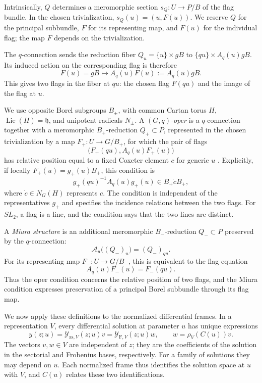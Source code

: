 \documentclass[11pt,leqno]{amsart}
\numberwithin{equation}{section}
\theoremstyle{plain}
\theoremstyle{definition}
\theoremstyle{plain}
\theoremstyle{definition}
\theoremstyle{remark}
\newcommand{\gh}{\mathfrak h}
\begin{document}
Intrinsically, $Q$ determines a meromorphic section $s_Q:U\to P/B$ of the flag bundle.  In the chosen trivialization, $s_Q(u)=(u,F(u))$.  We reserve $Q$ for the principal subbundle, $F$ for its representing map, and $F(u)$ for the individual flag; the map $F$ depends on the trivialization.

The $q$-connection sends the reduction fiber $Q_u=\{u\}\times gB$ to $\{qu\}\times A_q(u)gB$.  Its induced action on the corresponding flag is therefore
\[
 F(u)=gB\longmapsto A_q(u)F(u):=A_q(u)gB.
\]
This gives two flags in the fiber at $qu$: the chosen flag $F(qu)$ and the image of the flag at $u$.

We use opposite Borel subgroups $B_\pm$, with common Cartan torus $H$, $\operatorname{Lie}(H)=\gh$, and unipotent radicals $N_\pm$.  A \emph{$(G,q)$-oper} is a $q$-connection together with a meromorphic $B_+$-reduction $Q_+\subset P$, represented in the chosen trivialization by a map $F_+:U\to G/B_+$, for which the pair of flags
\[
 \bigl(F_+(qu),A_q(u)F_+(u)\bigr)
\]
has relative position equal to a fixed Coxeter element $c$ for generic $u$ \cite{FKSZ2020}.  Explicitly, if locally $F_+(u)=g_+(u)B_+$, this condition is
\[
 g_+(qu)^{-1}A_q(u)g_+(u)\in B_+\dot cB_+,
\]
where $\dot c\in N_G(H)$ represents $c$.  The condition is independent of the representatives $g_+$ and specifies the incidence relations between the two flags.  For $SL_2$, a flag is a line, and the condition says that the two lines are distinct.

A \emph{Miura structure} is an additional meromorphic $B_-$-reduction $Q_-\subset P$ preserved by the $q$-connection:
\[
 \mathcal A_u\bigl((Q_-)_u\bigr)=(Q_-)_{qu}.
\]
For its representing map $F_-:U\to G/B_-$, this is equivalent to the flag equation
\[
 A_q(u)F_-(u)=F_-(qu).
\]
Thus the oper condition concerns the relative position of two flags, and the Miura condition expresses preservation of a principal Borel subbundle through its flag map.

We now apply these definitions to the normalized differential frames.  In a representation $V$, every differential solution at parameter $u$ has unique expressions
\[
 y(z;u)=\mathcal Y_{\mathrm{as},V}(z;u)v
       =\mathcal Y_{\mathrm F,V}(z;u)w,
 \qquad w=\rho_V(C(u))v.
\]
The vectors $v,w\in V$ are independent of $z$; they are the coefficients of the solution in the sectorial and Frobenius bases, respectively.  For a family of solutions they may depend on $u$.  Each normalized frame thus identifies the solution space at $u$ with $V$, and $C(u)$ relates these two identifications.
\end{document}
